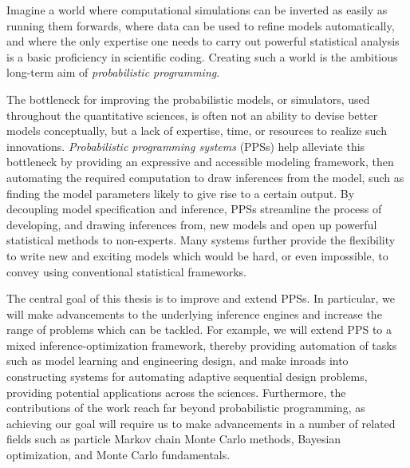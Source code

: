 
\vspace{20pt}
Imagine a world where computational simulations can be inverted as easily as running them forwards, where data
can be used to refine models automatically, and where the only expertise one needs to carry
out powerful statistical analysis is a basic proficiency in scientific coding.  Creating such a
world is the ambitious long-term aim of \emph{probabilistic programming}.

The bottleneck for improving the probabilistic models, or simulators, used throughout the quantitative sciences,
is often not an ability to devise better models conceptually,  but a lack of expertise,
time, or resources to realize such innovations.
\emph{Probabilistic programming systems} (PPSs) help alleviate this bottleneck 
by providing an expressive and accessible modeling framework,
 then
automating the required computation to draw inferences from the model, such as finding
the model parameters likely to give rise to a certain output.
By decoupling model specification and inference, PPSs 
streamline the process of developing, and drawing inferences from, new models
and open up powerful statistical methods to non-experts.
Many systems further provide
the flexibility to write new and exciting models which would be hard, or even impossible, to convey using 
conventional statistical frameworks.

The central goal of this thesis is to improve and extend PPSs.
In particular, we will
make advancements to the underlying inference engines and increase the
range of problems which can be tackled.  For example, we will extend PPS to a mixed inference-optimization
framework, thereby providing automation of tasks
such as model learning and engineering design, and make inroads into constructing systems
for automating adaptive sequential design problems, providing potential applications across the sciences.
Furthermore, the contributions of the work reach far beyond probabilistic programming, as 
achieving our goal will require us to make
advancements in a number of related fields such as particle Markov chain Monte Carlo methods,
Bayesian optimization, and Monte Carlo fundamentals. %

